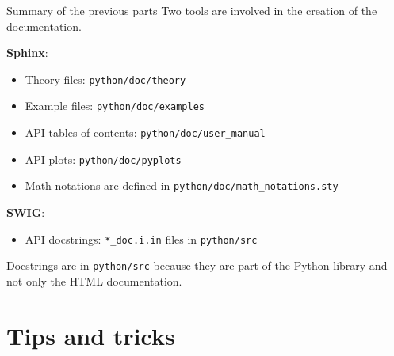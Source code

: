 \documentclass[8pt, handout]{beamer}
\begin{document}
\begin{frame}{Summary of the previous parts}
Two tools are involved in the creation of the documentation.

\textbf{Sphinx}:
\begin{itemize}
    \item Theory files: \texttt{python/\alert{doc}/theory}
    \item Example files: \texttt{python/\alert{doc}/examples}
    \item API tables of contents: \texttt{python/\alert{doc}/user\_manual}
    \item API plots: \texttt{python/\alert{doc}/pyplots}
    \item Math notations are defined in \href{https://github.com/openturns/openturns/blob/master/python/doc/math_notations.sty}{\texttt{python/\alert{doc}/math\_notations.sty}}
\end{itemize}

\textbf{SWIG}:
\begin{itemize}
    \item API docstrings: \texttt{*\_doc.i.in} files in \texttt{python/\alert{src}}
\end{itemize}

Docstrings are in \texttt{python/\alert{src}} because they are part of the Python library and not only the HTML documentation.

\end{frame}



\section{Tips and tricks}

\end{document}
